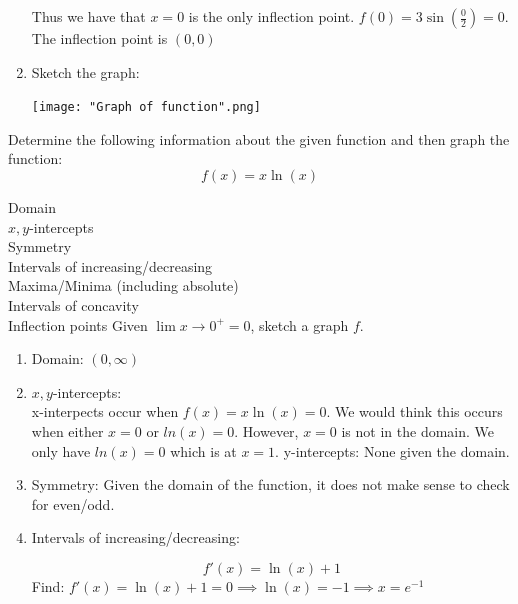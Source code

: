 \documentclass[nooutcomes]{ximera}
\begin{document}
\begin{problem}
\begin{freeResponse}
\begin{enumerate}
            Thus we have that $x = 0$ is the only inflection point.  $f(0)=3\sin\left(\frac{0}{2}\right)=0$.  The inflection point is $(0,0)$
            
            

   

  \item Sketch the graph: 
        \begin{image}
        \texttt{[image: "Graph of function".png]}
      \end{image}
  
  
\end{enumerate}
\end{freeResponse}
\end{problem}


\begin{problem}
  Determine the following information about the given function and then graph the function:
  \[
    f(x) = x\ln(x)
  \]

 Domain\\
  $x,y$-intercepts\\
  Symmetry\\
  Intervals of increasing/decreasing\\
  Maxima/Minima (including absolute)\\
  Intervals of concavity\\
  Inflection points
Given $\lim{x \to 0^+}=0$, sketch a graph $f$.

\begin{freeResponse}
\begin{enumerate}


\item Domain: $(0,\infty)$

\item $x,y$-intercepts:\\
x-interpects occur when $f(x) = x\ln(x) =0$.  We would think this occurs when either $x=0$ or $ln(x)=0$.  However, $x=0$ is not in the domain.  We only have $ln(x)=0$ which is at $x=1$.
y-intercepts: None given the domain.


\item Symmetry: Given the domain of the function, it does not make sense to check for even/odd.

\item Intervals of increasing/decreasing:

$$f'(x)=\ln(x)+1$$
Find: $f'(x)=\ln(x)+1=0 \implies \ln(x)=-1 \implies x=e^{-1}$\\


\end{enumerate}
\end{freeResponse}
\end{problem}
\end{document}
